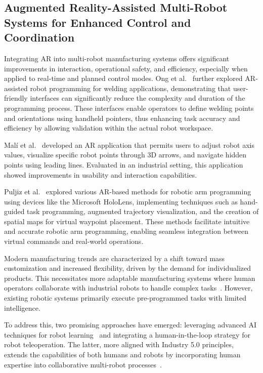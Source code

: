 \subsection{Augmented Reality-Assisted Multi-Robot Systems for Enhanced Control and Coordination}

Integrating \ac{AR} into multi-robot manufacturing systems offers significant improvements in interaction, operational safety, and efficiency, especially when applied to real-time and planned control modes. Ong et al.~\cite{ong2020} further explored \ac{AR}-assisted robot programming for welding applications, demonstrating that user-friendly interfaces can significantly reduce the complexity and duration of the programming process. These interfaces enable operators to define welding points and orientations using handheld pointers, thus enhancing task accuracy and efficiency by allowing validation within the actual robot workspace.

Malí et al.~\cite{7819154} developed an \ac{AR} application that permits users to adjust robot axis values, visualize specific robot points through 3D arrows, and navigate hidden points using leading lines. Evaluated in an industrial setting, this application showed improvements in usability and interaction capabilities.

Puljiz et al.~\cite{puljiz2019conceptsendtoendaugmentedreality,puljiz2} explored various \ac{AR}-based methods for robotic arm programming using devices like the Microsoft HoloLens, implementing techniques such as hand-guided task programming, augmented trajectory visualization, and the creation of spatial maps for virtual waypoint placement. These methods facilitate intuitive and accurate robotic arm programming, enabling seamless integration between virtual commands and real-world operations.

Modern manufacturing trends are characterized by a shift toward mass customization and increased flexibility, driven by the demand for individualized products. This necessitates more adaptable manufacturing systems where human operators collaborate with industrial robots to handle complex tasks~\cite{1-ar-dt,2-ar-dt,3-ar-dt}. However, existing robotic systems primarily execute pre-programmed tasks with limited intelligence.

To address this, two promising approaches have emerged: leveraging advanced \ac{AI} techniques for robot learning~\cite{6-ar-dt} and integrating a human-in-the-loop strategy for robot teleoperation. The latter, more aligned with Industry 5.0 principles, extends the capabilities of both humans and robots by incorporating human expertise into collaborative multi-robot processes~\cite{7-ar-dt}.

